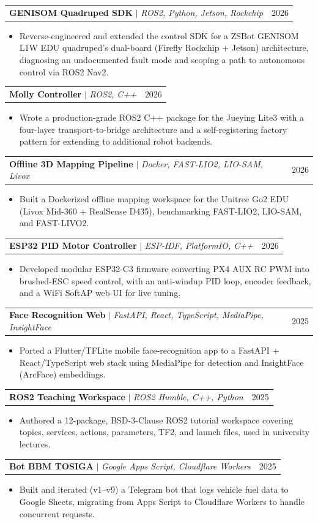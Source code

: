 \documentclass[a4paper,11pt]{article}
\makeatletter
\newcommand{\resumeItem}[1]{
  \item\small{
    {#1 \vspace{-2pt}}
  }
}
\newcommand{\resumeProjectHeading}[2]{
    \item
    \begin{tabular*}{0.97\textwidth}{l@{\extracolsep{\fill}}r}
      \small#1 & #2 \\
    \end{tabular*}\vspace{-7pt}
}
\newcommand{\resumeItemListStart}{\begin{itemize}}
\newcommand{\resumeItemListEnd}{\end{itemize}\vspace{-5pt}}
\makeatother
\begin{document}
    \resumeProjectHeading
      {\textbf{GENISOM Quadruped SDK} $|$ \emph{ROS2, Python, Jetson, Rockchip}}{2026}
      \resumeItemListStart
        \resumeItem{Reverse-engineered and extended the control SDK for a ZSBot GENISOM L1W EDU quadruped's dual-board (Firefly Rockchip + Jetson) architecture, diagnosing an undocumented fault mode and scoping a path to autonomous control via ROS2 Nav2.}
      \resumeItemListEnd

    \resumeProjectHeading
      {\textbf{Molly Controller} $|$ \emph{ROS2, C++}}{2026}
      \resumeItemListStart
        \resumeItem{Wrote a production-grade ROS2 C++ package for the Jueying Lite3 with a four-layer transport-to-bridge architecture and a self-registering factory pattern for extending to additional robot backends.}
      \resumeItemListEnd

    \resumeProjectHeading
      {\textbf{Offline 3D Mapping Pipeline} $|$ \emph{Docker, FAST-LIO2, LIO-SAM, Livox}}{2026}
      \resumeItemListStart
        \resumeItem{Built a Dockerized offline mapping workspace for the Unitree Go2 EDU (Livox Mid-360 + RealSense D435), benchmarking FAST-LIO2, LIO-SAM, and FAST-LIVO2.}
      \resumeItemListEnd

    \resumeProjectHeading
      {\textbf{ESP32 PID Motor Controller} $|$ \emph{ESP-IDF, PlatformIO, C++}}{2026}
      \resumeItemListStart
        \resumeItem{Developed modular ESP32-C3 firmware converting PX4 AUX RC PWM into brushed-ESC speed control, with an anti-windup PID loop, encoder feedback, and a WiFi SoftAP web UI for live tuning.}
      \resumeItemListEnd

    \resumeProjectHeading
      {\textbf{Face Recognition Web} $|$ \emph{FastAPI, React, TypeScript, MediaPipe, InsightFace}}{2025}
      \resumeItemListStart
        \resumeItem{Ported a Flutter/TFLite mobile face-recognition app to a FastAPI + React/TypeScript web stack using MediaPipe for detection and InsightFace (ArcFace) embeddings.}
      \resumeItemListEnd

    \resumeProjectHeading
      {\textbf{ROS2 Teaching Workspace} $|$ \emph{ROS2 Humble, C++, Python}}{2025}
      \resumeItemListStart
        \resumeItem{Authored a 12-package, BSD-3-Clause ROS2 tutorial workspace covering topics, services, actions, parameters, TF2, and launch files, used in university lectures.}
      \resumeItemListEnd

    \resumeProjectHeading
      {\textbf{Bot BBM TOSIGA} $|$ \emph{Google Apps Script, Cloudflare Workers}}{2025}
      \resumeItemListStart
        \resumeItem{Built and iterated (v1--v9) a Telegram bot that logs vehicle fuel data to Google Sheets, migrating from Apps Script to Cloudflare Workers to handle concurrent requests.}
      \resumeItemListEnd
\end{document}
